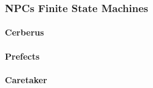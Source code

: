 
\subsubsection{NPCs Finite State Machines}

\paragraph{Cerberus}

\paragraph{Prefects}

\paragraph{Caretaker}
